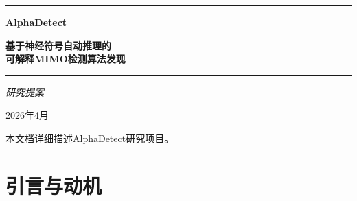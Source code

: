 \documentclass[12pt,a4paper]{article}
\begin{document}
\begin{titlepage}
  \thispagestyle{empty}
  \centering
  \vspace*{1.5cm}
  {\color{myblue}\rule{\linewidth}{1.5pt}}\vspace{0.5em}

  {\Huge\bfseries\color{myblue} AlphaDetect}\vspace{0.4em}

  {\Large\bfseries 基于神经符号自动推理的\\
  可解释MIMO检测算法发现}\vspace{0.5em}

  {\color{myblue}\rule{\linewidth}{1.5pt}}\vspace{2em}

  {\large\textit{研究提案}}\vspace{1em}

  {\normalsize 2026年4月}\vspace{3cm}

  \begin{abstract}
    \noindent
    本文提出\textbf{AlphaDetect}，一个用于自动发现可解释MIMO检测算法的统一框架。
    AlphaDetect将算法发现建立在\emph{形式化推理}基础之上，通过四个紧密集成的组件实现：
    (i)~带类型的领域特定语言（Typed DSL），以精确的数学类型和算法组合子编码信号处理与
    概率推断原语；(ii)~问题变换库（Problem Transformation Library），将中间概念的
    发明重新定义为类型化变换的见证生成；(iii)~计算机代数系统（CAS），逐步执行算法更新
    方程的符号推导；(iv)~LLM增强的结构映射引擎（SME），利用LLM生成的谓词表示实现
    跨领域的概念迁移。这些组件协同解决算法发现的核心挑战——发明新的\emph{中间概念}
    （如将MIMO模型识别为因子图，或引入腔分布），这一过程无法归结为在固定概念空间上的
    搜索。本文详细描述了完整的系统架构、每个组件及其实现方式，并通过案例研究
    （EP-MIMO、GTA、BP引导的球形译码）展示已知算法如何在该框架内被重新推导。
  \end{abstract}

  \vfill
  {\color{gray}\small 本文档详细描述AlphaDetect研究项目。}
\end{titlepage}

\tableofcontents
\newpage
{}

\section{引言与动机}
\label{sec:intro}
\end{document}
